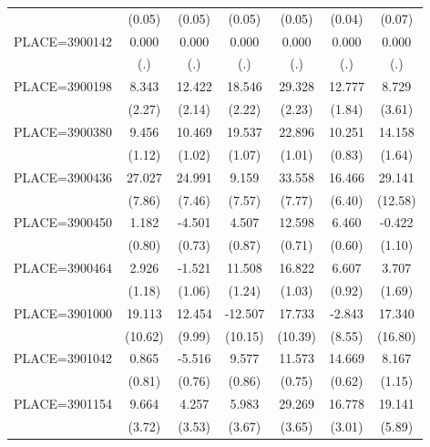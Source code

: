 {\begin{tabular}{l*{6}{c}}
                    &      (0.05)&      (0.05)&      (0.05)&      (0.05)&      (0.04)&      (0.07)\\
PLACE=3900142       &       0.000&       0.000&       0.000&       0.000&       0.000&       0.000\\
                    &         (.)&         (.)&         (.)&         (.)&         (.)&         (.)\\
PLACE=3900198       &       8.343&      12.422&      18.546&      29.328&      12.777&       8.729\\
                    &      (2.27)&      (2.14)&      (2.22)&      (2.23)&      (1.84)&      (3.61)\\
PLACE=3900380       &       9.456&      10.469&      19.537&      22.896&      10.251&      14.158\\
                    &      (1.12)&      (1.02)&      (1.07)&      (1.01)&      (0.83)&      (1.64)\\
PLACE=3900436       &      27.027&      24.991&       9.159&      33.558&      16.466&      29.141\\
                    &      (7.86)&      (7.46)&      (7.57)&      (7.77)&      (6.40)&     (12.58)\\
PLACE=3900450       &       1.182&      -4.501&       4.507&      12.598&       6.460&      -0.422\\
                    &      (0.80)&      (0.73)&      (0.87)&      (0.71)&      (0.60)&      (1.10)\\
PLACE=3900464       &       2.926&      -1.521&      11.508&      16.822&       6.607&       3.707\\
                    &      (1.18)&      (1.06)&      (1.24)&      (1.03)&      (0.92)&      (1.69)\\
PLACE=3901000       &      19.113&      12.454&     -12.507&      17.733&      -2.843&      17.340\\
                    &     (10.62)&      (9.99)&     (10.15)&     (10.39)&      (8.55)&     (16.80)\\
PLACE=3901042       &       0.865&      -5.516&       9.577&      11.573&      14.669&       8.167\\
                    &      (0.81)&      (0.76)&      (0.86)&      (0.75)&      (0.62)&      (1.15)\\
PLACE=3901154       &       9.664&       4.257&       5.983&      29.269&      16.778&      19.141\\
                    &      (3.72)&      (3.53)&      (3.67)&      (3.65)&      (3.01)&      (5.89)\\

\end{tabular}}
